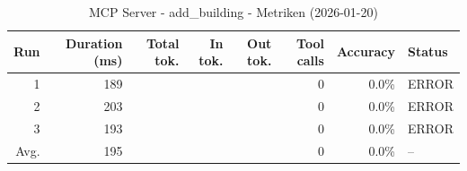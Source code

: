 \begin{table}[ht]
\centering
\small
\caption{MCP Server - add\_building - Metriken (2026-01-20)}
\label{tab:mcp\_add\_building\_metrics\_2026-01-20}
\begin{tabular}{r r r r r r r l}
\hline
Run & Duration (ms) & Total tok. & In tok. & Out tok. & Tool calls & Accuracy & Status \\
\hline
1 & 189 &  &  &  & 0 & 0.0\% & ERROR \\
2 & 203 &  &  &  & 0 & 0.0\% & ERROR \\
3 & 193 &  &  &  & 0 & 0.0\% & ERROR \\
\hline
Avg. & 195 &  &  &  & 0 & 0.0\% & -- \\
\hline
\end{tabular}
\end{table}
